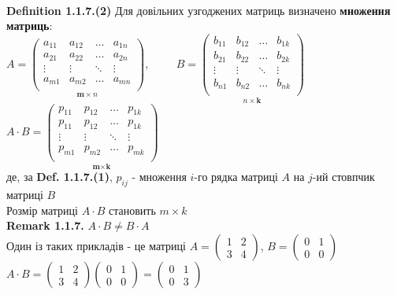 \documentclass[a4paper, 14pt]{extarticle}
\def\defin#1{\textbf{Definition {#1}}}
\def\rm#1{\textbf{Remark {#1}}}
\def\bigline{\vspace{5mm}\\}
\begin{document}
	\bigline
	\defin{1.1.7.(2)} Для довільних узгоджених матриць визначено \textbf{множення матриць}:\\
	$A = \underset{\textbf{m} \times n}{\begin{pmatrix}
	a_{11} & a_{12} & \dots & a_{1n} \\
	a_{21} & a_{22} & \dots & a_{2n} \\
	\vdots & \vdots & \ddots & \vdots \\
	a_{m1} & a_{m2} & \dots & a_{mn} \\
	\end{pmatrix}}, \hspace{1cm} B = \underset{n \times \textbf{k}}{\begin{pmatrix}
	b_{11} & b_{12} & \dots & b_{1k} \\
    	b_{21} & b_{22} & \dots & b_{2k} \\
    	\vdots & \vdots & \ddots & \vdots \\
    	b_{n1} & b_{n2} & \dots & b_{nk} \\
	\end{pmatrix}}$\\
	$A \cdot B = \underset{\textbf{m} \times \textbf{k}}{\begin{pmatrix}
	p_{11} & p_{12} & \dots & p_{1k} \\
	p_{11} & p_{12} & \dots & p_{1k} \\
	\vdots & \vdots & \ddots & \vdots \\
	p_{m1} & p_{m2} & \dots & p_{mk} \\
	\end{pmatrix}}$\\
	де, за \textbf{Def. 1.1.7.(1)}, $p_{ij}$ - множення $i$-го рядка матриці $A$ на $j$-ий стовпчик матриці $B$\\
	Розмір матриці $A \cdot B$ становить $m \times k$
	\bigline
	\rm{1.1.7.} $A \cdot B \neq B \cdot A$\\
	Один із таких прикладів - це матриці $A = \begin{pmatrix}
	1 & 2 \\
	3 & 4
	\end{pmatrix}$, $B = \begin{pmatrix}
	0 & 1 \\
	0 & 0
\end{pmatrix}$\\
$A \cdot B = \begin{pmatrix} 1 & 2 \\ 3 & 4 \end{pmatrix} \begin{pmatrix} 0 & 1 \\ 0 & 0 \end{pmatrix} = \begin{pmatrix} 0 & 1 \\ 0 & 3 
\end{pmatrix}$\\
\end{document}
